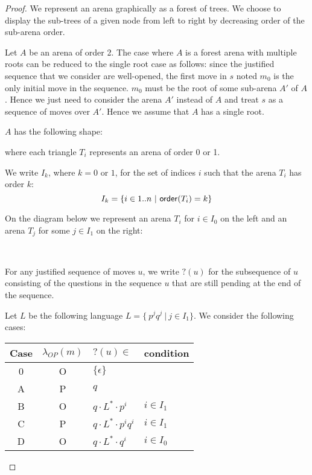 \begin{proof}
We represent an arena graphically as a forest of trees. We choose to display the sub-trees of a given node
from left to right by decreasing order of the sub-arena order.

Let $A$ be an arena of order 2.
The case where $A$ is a forest arena with multiple roots can be reduced to the single root case as follows:
since the justified sequence that we consider are well-opened, the first move in $s$ noted $m_0$ is the only initial move in the sequence.
$m_0$ must be the root of some sub-arena $A'$ of $A$. Hence we just need to consider the arena $A'$ instead of $A$ and treat $s$ as a sequence
of moves over $A'$. Hence we assume that $A$ has a single root.

$A$ has the following shape:
\begin{center}
    {
 \SubTree[linestyle=none]{$\ldots$} 
      \TR{\ldots} }
\end{center}

where each triangle $T_i$ represents an arena of order 0 or 1.


We write $I_k$, where $k=0$ or $1$, for the set of indices $i$ such that the arena $T_i$ has order $k$:
$$I_k = \{ i \in 1.. n\ |\ {\sf order}(T_i) = k \}$$

On the diagram below we represent an arena $T_i$ for $i \in I_0$ on the left and an arena $T_j$ for some $j \in I_1$ on the right:
\begin{center}
\
    {   \TR{\ldots} }
\hspace{2cm}
    {
        {   \TR{\ldots} }
        \TR{\ldots}
    }
\end{center}



For any justified sequence of moves $u$, we write $?(u)$ for the
subsequence of $u$ consisting of the questions in the sequence $u$
that are still pending at the end of the sequence.

Let $L$ be the following language $L = \{\ p^j q^j\ | \ j \in I_1
\}$. We consider the following cases:

\begin{center}
\begin{tabular}{c|c|l|l}
Case & $\lambda_{OP}(m)$ & $?(u) \in$ & condition \\ \hline
0 & O & $\{ \epsilon \}$ \\
A & P & $q$ \\
B & O & $q \cdot L^* \cdot p^i$     & $i \in I_1$ \\
C & P & $q \cdot L^* \cdot p^i q^i$ & $i \in I_1$ \\
D & O & $q \cdot L^* \cdot q^i$      & $i \in I_0$ \\
\end{tabular}
\end{center}


\end{proof}
